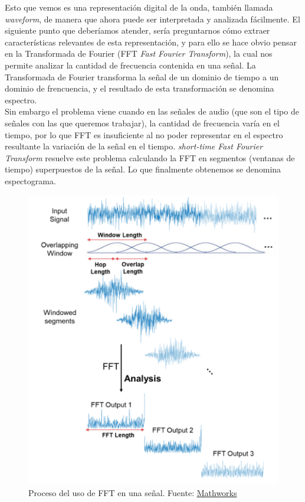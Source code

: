 \documentclass[11pt,a4paper,spanish]{book}
\begin{document}
	Esto que vemos es una representación digital de la onda, también llamada \emph{waveform}, de manera que ahora puede ser interpretada y analizada fácilmente.\hfill \break
	El siguiente punto que deberíamos atender, sería preguntarnos cómo extraer características relevantes de esta representación, y para ello se hace obvio pensar en la Transformada de Fourier (FFT \emph{Fast Fourier Transform}), la cual nos permite analizar la cantidad de frecuencia contenida en una señal. La Transformada de Fourier transforma la señal de un dominio de tiempo a un dominio de frencuencia, y el resultado de esta transformación se denomina espectro. \\
	Sin embargo el problema viene cuando en las señales de audio (que son el tipo de señales con las que queremos trabajar), la cantidad de frecuencia varía en el tiempo, por lo que FFT es insuficiente al no poder representar en el espectro resultante la variación de la señal en el tiempo. \emph{short-time Fast Fourier Transform} resuelve este problema calculando la FFT en segmentos (ventanas de tiempo) superpuestos de la señal. Lo que finalmente obtenemos se denomina espectograma.
	\
	\begin{figure}[h]
		\centering
		\includegraphics[scale=0.3]{processFFT.png} 
		\caption{Proceso del uso de FFT en una señal. Fuente: \href{https://www.mathworks.com/help/dsp/ref/dsp.stft.html}{Mathworks}}
	\end{figure}


	
	

	
	
	\printbibliography
	
\end{document}

